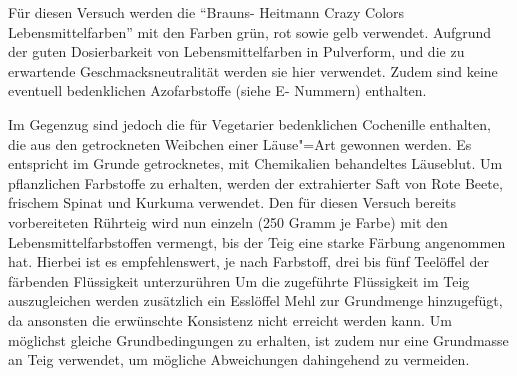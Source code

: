 \documentclass[11pt]{scrreprt}
\begin{document}
 Für diesen  Versuch werden die \enquote{Brauns- Heitmann Crazy Colors Lebensmittelfarben} mit den Farben grün, rot sowie gelb verwendet. Aufgrund der guten Dosierbarkeit von Lebensmittelfarben in Pulverform, und die zu erwartende Geschmacksneutralität werden sie hier verwendet. Zudem sind keine eventuell bedenklichen Azofarbstoffe (siehe E- Nummern) enthalten. 
 
 Im Gegenzug sind jedoch die für Vegetarier bedenklichen Cochenille enthalten, die aus den getrockneten Weibchen einer Läuse"=Art gewonnen werden. Es entspricht im Grunde getrocknetes, mit Chemikalien behandeltes Läuseblut. Um  pflanzlichen Farbstoffe zu erhalten, werden  der extrahierter Saft von Rote Beete, frischem Spinat und Kurkuma verwendet. Den für diesen Versuch bereits  vorbereiteten Rührteig wird nun einzeln (250 Gramm je Farbe) mit den Lebensmittelfarbstoffen vermengt, bis der Teig eine starke Färbung angenommen hat. Hierbei ist es empfehlenswert, je nach Farbstoff, drei bis fünf Teelöffel der färbenden Flüssigkeit unterzurühren Um die zugeführte Flüssigkeit im Teig auszugleichen werden zusätzlich ein Esslöffel Mehl zur Grundmenge hinzugefügt, da ansonsten die erwünschte Konsistenz nicht erreicht werden kann.
Um möglichst gleiche Grundbedingungen zu erhalten, ist zudem nur eine Grundmasse an Teig verwendet, um mögliche Abweichungen dahingehend zu vermeiden. 
 
\end{document}
